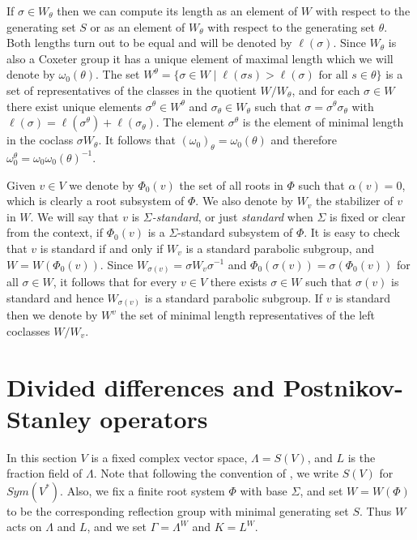 \documentclass[11pt,fleqn]{amsart}
\newcounter{para}[section]
\begin{document}
If $\sigma \in W_\theta$ then we can compute its length as an element of $W$ 
with respect to the generating set $S$ or as an element of $W_\theta$ with 
respect to the generating set $\theta$. Both lengths turn out to be 
equal and will be denoted by $\ell(\sigma)$. Since $W_\theta$ is also a 
Coxeter group it has a unique element of maximal length which we will denote 
by $\omega_0(\theta)$. The set $W^\theta = \{\sigma \in W \mid \ell(\sigma s) >
\ell(\sigma) \mbox{ for all } s \in \theta\}$ is a set of representatives of 
the classes in the quotient $W/W_\theta$, and for each $\sigma \in W$ there 
exist unique elements $\sigma^\theta \in W^\theta$ and $\sigma_\theta \in 
W_\theta$ such that $\sigma = \sigma^\theta\sigma_\theta$ with $\ell(\sigma) = 
\ell(\sigma^\theta) + \ell(\sigma_\theta)$. The element $\sigma^\theta$ is the 
element of minimal length in the coclass $\sigma W_\theta$. It follows that 
$(\omega_0)_\theta = \omega_0(\theta)$ and therefore $\omega_0^\theta = 
\omega_0 \omega_0(\theta)^{-1}$.

Given $v \in V$ we denote by $\Phi_0(v)$ the set of all roots in $\Phi$ such 
that $\alpha(v) = 0$, which is clearly a root subsystem of $\Phi$. We also 
denote by $W_v$ the stabilizer of $v$ in $W$. We will say that $v$ is 
\emph{$\Sigma$-standard}, or just \emph{standard} when $\Sigma$ is fixed or 
clear from the context, if $\Phi_0(v)$ is a $\Sigma$-standard subsystem of 
$\Phi$. It is easy to check that $v$ is standard if and only if $W_v$ is a 
standard parabolic subgroup, and $W =W(\Phi_0(v))$. Since $W_{\sigma(v)} = 
\sigma W_v \sigma^{-1}$ and $\Phi_0(\sigma(v)) = \sigma(\Phi_0(v))$ for all 
$\sigma \in W$, it follows that for every $v \in V$ there exists $\sigma \in 
W$ such that $\sigma(v)$ is standard and hence $W_{\sigma(v)}$ is a standard 
parabolic subgroup. If $v$ is standard then we denote by $W^v$ the set of 
minimal length representatives of the left coclasses $W/W_v$.


\section{Divided differences and Postnikov-Stanley operators}

In this section $V$ is a fixed complex vector space, $\Lambda = S(V)$, and $L$ is 
the fraction field of $\Lambda$.  Note that following the convention of 
\cite{PS-chains-bruhat}, we  write $S(V)$ for $Sym(V^*)$. Also, we fix a finite root system $\Phi$ with 
base $\Sigma$, and set $W = W(\Phi)$ to be the corresponding reflection group 
with minimal generating set $S$. Thus $W$ acts on $\Lambda$ and $L$, and we 
set $\Gamma = \Lambda^W$ and $K = L^W$.
\end{document}

